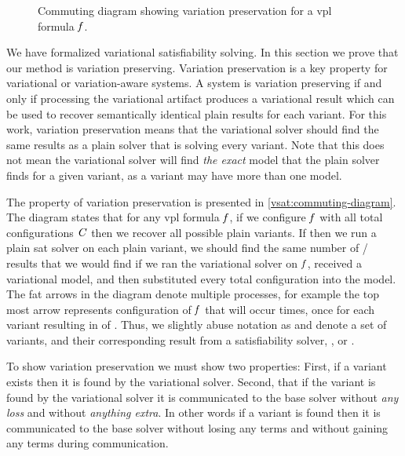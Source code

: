 \label{section:vsat:variation-preservation}
%
\begin{figure}[h]
  \centering
  
  \caption{Commuting diagram showing variation preservation for a \ac{vpl}
    formula $\mathit{f}$.}%
  \label{vsat:commuting-diagram}
\end{figure}
%
We have formalized variational satisfiability solving. In this section we prove
that our method is variation preserving. Variation preservation is a key
property for variational or variation-aware systems. A system is variation
preserving if and only if processing the variational artifact produces a
variational result which can be used to recover semantically identical plain
results for each variant. For this work, variation preservation means that the
variational solver should find the same results as a plain solver that is
solving every variant. Note that this does not mean the variational solver will
find \emph{the exact} model that the plain solver finds for a given variant, as
a variant may have more than one model.

The property of variation preservation is presented in
\autoref{vsat:commuting-diagram}. The diagram states that for any \ac{vpl}
formula $\mathit{f}$, if we configure $\mathit{f}$ with all total configurations
$\mathit{C}$ then we recover all possible plain variants. If then we run a plain
\ac{sat} solver on each plain variant, we should find the same number of
/ results that we would find if we ran the variational solver
on $\mathit{f}$, received a variational model, and then substituted every total
configuration into the model. The fat arrows in the diagram denote multiple
processes, for example the top most arrow represents configuration of $\mathit{f}$
that will occur  times, once for each variant resulting
in  of . Thus, we slightly abuse notation as
 and  denote a set of variants, and their corresponding result
from a satisfiability solver, \eg{},  or .

To show variation preservation we must show two properties: First, if a variant
exists then it is found by the variational solver. Second, that if the variant
is found by the variational solver it is communicated to the base solver without
\emph{any loss} and without \emph{anything extra}. In other words if a variant
is found then it is communicated to the base solver without losing any terms and
without gaining any terms during communication.

